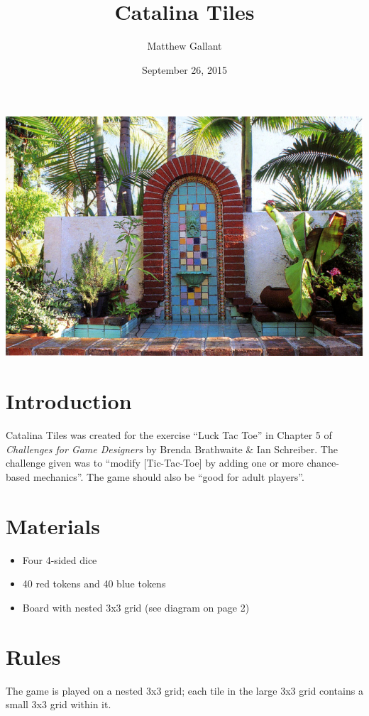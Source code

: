 \documentclass{article}
\title{Catalina Tiles}
\author{Matthew Gallant}
\date{September 26, 2015}
\begin{document}
\maketitle

\begin{center}
\includegraphics[width=\linewidth]{catalina_tiles}
\end{center}

\section{Introduction}
Catalina Tiles was created for the exercise ``Luck Tac Toe'' in Chapter 5 of \textit{Challenges for Game Designers} by Brenda Brathwaite \& Ian Schreiber. The challenge given was to ``modify [Tic-Tac-Toe] by adding one or more chance-based mechanics''. The game should also be ``good for adult players''.

\section{Materials}
\begin{itemize}
  \item Four 4-sided dice
  \item 40 red tokens and 40 blue tokens
  \item Board with nested 3x3 grid (see diagram on page 2)
\end{itemize}

\section{Rules}
The game is played on a nested 3x3 grid; each tile in the large 3x3 grid contains a small 3x3 grid within it.
\end{document}
